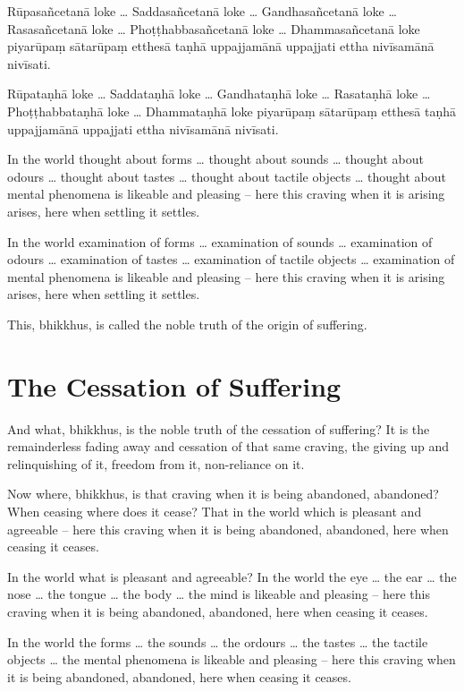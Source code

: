 Rūpasañcetanā loke \ldots{} Saddasañcetanā loke \ldots{} Gandhasañcetanā loke
\ldots{} Rasasañcetanā loke \ldots{} Phoṭṭhabbasañcetanā loke \ldots{}
Dhammasañcetanā loke piyarūpaṃ sātarūpaṃ etthesā taṇhā uppajjamānā uppajjati
ettha nivīsamānā nivīsati.

Rūpataṇhā loke \ldots{} Saddataṇhā loke \ldots{} Gandhataṇhā loke \ldots{}
Rasataṇhā loke \ldots{} Phoṭṭhabbataṇhā loke \ldots{} Dhammataṇhā loke piyarūpaṃ
sātarūpaṃ etthesā taṇhā uppajjamānā uppajjati ettha nivīsamānā nivīsati.

\englishPage

In the world thought about forms \ldots{} thought about sounds \ldots{} thought
about odours \ldots{} thought about tastes \ldots{} thought about tactile
objects \ldots{} thought about mental phenomena is likeable and pleasing -- here
this craving when it is arising arises, here when settling it settles.

In the world examination of forms \ldots{} examination of sounds \ldots{}
examination of odours \ldots{} examination of tastes \ldots{} examination of
tactile objects \ldots{} examination of mental phenomena is likeable and
pleasing -- here this craving when it is arising arises, here when settling it
settles.

This, bhikkhus, is called the noble truth of the origin of suffering.

\section{The Cessation of Suffering}

And what, bhikkhus, is the noble truth of the cessation of suffering? It is the
remainderless fading away and cessation of that same craving, the giving up and
relinquishing of it, freedom from it, non-reliance on it.

Now where, bhikkhus, is that craving when it is being abandoned, abandoned? When
ceasing where does it cease? That in the world which is pleasant and agreeable
-- here this craving when it is being abandoned, abandoned, here when ceasing it
ceases.

In the world what is pleasant and agreeable? In the world the eye \ldots{} the
ear \ldots{} the nose \ldots{} the tongue \ldots{} the body \ldots{} the mind is
likeable and pleasing -- here this craving when it is being abandoned, abandoned,
here when ceasing it ceases.

In the world the forms \ldots{} the sounds \ldots{} the ordours \ldots{} the
tastes \ldots{} the tactile objects \ldots{} the mental phenomena is likeable
and pleasing -- here this craving when it is being abandoned, abandoned, here
when ceasing it ceases.

